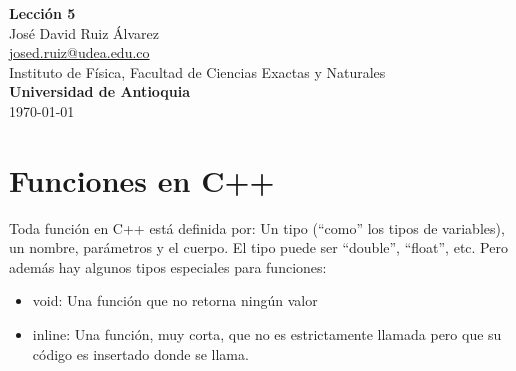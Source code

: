 \documentclass[10.5pt]{article}
\begin{document}
\noindent
\begin{minipage}[b]{0.75\linewidth}
{\LARGE\bf Lecci\'{o}n 5}\\ %
\large{Jos\'{e} David Ruiz \'{A}lvarez} \\
\small{\href{mailto:josed.ruiz@udea.edu.co}{josed.ruiz@udea.edu.co}} \\ %
\normalsize{Instituto de Física, Facultad de Ciencias Exactas y Naturales} \\%
\normalsize{\bf Universidad de Antioquia} \\[8mm]
\today %
\end{minipage}%



\section{Funciones en C++}

Toda función en C++ está definida por: Un tipo (``como'' los tipos de variables), un nombre, parámetros y el cuerpo. El tipo puede ser ``double'', ``float'', etc. Pero además hay algunos tipos especiales para funciones:

\begin{itemize}
\item void: Una función que no retorna ningún valor
\item inline: Una función, muy corta, que no es estrictamente llamada pero que su código es insertado donde se llama.
\end{itemize}
\end{document}
